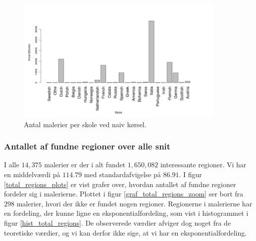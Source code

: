 {\begin{figure}[!h]
	\centering
	\includegraphics[angle=0,width=0.90\textwidth]{afsnit/resultater/billeder/nationNrImage.png}
	\caption{Antal malerier per skole ved naiv kørsel.}
	\label{naiv_nationNrImage}
\end{figure}

\subsubsection{Antallet af fundne regioner over alle snit}
I alle $14,375$ malerier er der i alt fundet $1,650,082$ interessante
regioner. Vi har en middelværdi på $114.79$ med standardafvigelse på
$86.91$. I figur \ref{total_regions_plots} er vist grafer over, hvordan
antallet af fundne regioner fordeler sig i malerierne. Plottet i figur
\ref{graf_total_regions_zoom} ser bort fra $298$ malerier, hvori der
ikke er fundet nogen regioner. Regionerne i malerierne har en fordeling,
der kunne ligne en eksponentialfordeling, som vist i histogrammet i
figur \ref{hist_total_regions}. De observerede værdier afviger dog noget
fra de teoretiske værdier, og vi kan derfor ikke sige, at vi har en
eksponentialfordeling.

}
